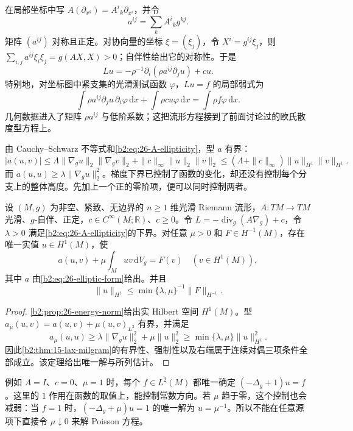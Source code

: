 在局部坐标中写 \(A(\partial_{x^k})=A^i{}_k\partial_{x^i}\)，并令
\[
 a^{ij}=\sum_kA^i{}_kg^{kj}.
\]
矩阵 \((a^{ij})\) 对称且正定。对协向量的坐标 \(\xi=(\xi_j)\)，令 \(X^i=g^{ij}\xi_j\)，则
\(\sum_{i,j}a^{ij}\xi_i\xi_j=g(AX,X)>0\)；自伴性给出它的对称性。于是
\begin{equation}
\label{b2:eq:26-elliptic-coordinate}
 Lu=-\rho^{-1}\partial_i(\rho a^{ij}\partial_ju)+cu.
\end{equation}
特别地，对坐标图中紧支集的光滑测试函数 \(\varphi\)，\(Lu=f\) 的局部弱式为
\[
 \int\rho a^{ij}\partial_ju\,\partial_i\varphi\,\mathrm dx
 +\int\rho cu\varphi\,\mathrm dx
 =\int\rho f\varphi\,\mathrm dx.
\]
几何数据进入了矩阵 \(\rho a^{ij}\) 与低阶系数；这把流形方程接到了前面讨论过的欧氏散度型方程上。

由 Cauchy--Schwarz 不等式和\eqref{b2:eq:26-A-ellipticity}，型 \(a\) 有界：
\[
 |a(u,v)|
 \leq\Lambda\|\nabla_g u\|_2\|\nabla_g v\|_2
       +\|c\|_\infty\|u\|_2\|v\|_2
 \leq(\Lambda+\|c\|_\infty)\|u\|_{H^1}\|v\|_{H^1}.
\]
而 \(a(u,u)\geq\lambda\|\nabla_g u\|_2^2\)。梯度下界已控制了函数的变化，却还没有控制每个分支上的整体高度。先加上一个正的零阶项，便可以同时控制两者。

\begin{theorem}[正移位方程的弱可解性]
\label{b2:thm:26-shifted-weak}
设 \((M,g)\) 为非空、紧致、无边界的 \(n\geq1\) 维光滑 Riemann 流形，\(A:TM\to TM\) 光滑、\(g\)-自伴、正定，\(c\in C^\infty(M;\mathbb R)\)、\(c\geq0\)。令 \(L=-\operatorname{div}_g(A\nabla_g)+c\)，令 \(\lambda>0\) 满足\eqref{b2:eq:26-A-ellipticity}的下界。对任意 \(\mu>0\) 和 \(F\in H^{-1}(M)\)，存在唯一实值 \(u\in H^1(M)\)，使
\[
 a(u,v)+\mu\int_Muv\,\mathrm dV_g=F(v)
 \quad(v\in H^1(M)),
\]
其中 \(a\) 由\eqref{b2:eq:26-elliptic-form}给出。并且
\[
 \|u\|_{H^1}
 \leq\min\{\lambda,\mu\}^{-1}\|F\|_{H^{-1}}.
\]
\end{theorem}
\begin{proof}
\cref{b2:prop:26-energy-norm}给出实 Hilbert 空间 \(H^1(M)\)。型
\(a_\mu(u,v)=a(u,v)+\mu(u,v)_{L^2}\) 有界，并满足
\[
 a_\mu(u,u)\geq\lambda\|\nabla_g u\|_2^2+\mu\|u\|_2^2
 \geq\min\{\lambda,\mu\}\|u\|_{H^1}^2.
\]
因此\cref{b2:thm:15-lax-milgram}的有界性、强制性以及右端属于连续对偶三项条件全部成立。该定理给出唯一解与所列估计。
\end{proof}

例如 \(A=I\)、\(c=0\)、\(\mu=1\) 时，每个 \(f\in L^2(M)\) 都唯一确定
\((-\Delta_g+1)u=f\)。这里的 \(1\) 作用在函数的取值上，能控制常数方向。若 \(\mu\) 趋于零，这个控制也会减弱：当 \(f=1\) 时，\((-\Delta_g+\mu)u=1\) 的唯一解为 \(u=\mu^{-1}\)。所以不能在任意源项下直接令 \(\mu\downarrow0\) 来解 Poisson 方程。

